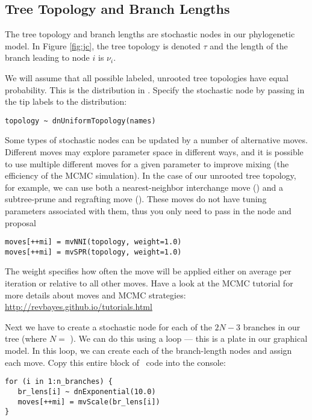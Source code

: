\subsection{Tree Topology and Branch Lengths}

The tree topology and branch lengths are stochastic nodes in our phylogenetic model. 
In Figure \ref{fig:jc}, the tree topology is denoted $\tau$ and the length of the branch leading to node $i$ is $\nu_i$.

We will assume that all possible labeled, unrooted tree topologies have equal probability. This is the  distribution in \RevBayes. Specify the  stochastic node by passing in the tip labels  to the  distribution:
{\tt \begin{snugshade*}
\begin{lstlisting}
topology ~ dnUniformTopology(names)
\end{lstlisting}
\end{snugshade*}}

Some types of stochastic nodes can be updated by a number of alternative moves. 
Different moves may explore parameter space in different ways, and it is possible to use multiple different moves for a given parameter to improve mixing (the efficiency of the MCMC simulation). 
In the case of our unrooted tree topology, for example, we can use both a nearest-neighbor interchange move () and a subtree-prune and regrafting move (). 
These moves do not have tuning parameters associated with them, thus you only need to pass in the  node and proposal  
{\tt \begin{snugshade*}
\begin{lstlisting}
moves[++mi] = mvNNI(topology, weight=1.0)
moves[++mi] = mvSPR(topology, weight=1.0)
\end{lstlisting}
\end{snugshade*}}
The weight specifies how often the move will be applied either on average per iteration or relative to all other moves.
Have a look at the MCMC tutorial for more details about moves and MCMC strategies: \href{http://revbayes.github.io/tutorials.html}{http://revbayes.github.io/tutorials.html}


Next we have to create a stochastic node for each of the $2N-3$ branches in our tree (where $N=$ ). 
We can do this using a  loop --- this is a plate in our graphical model. In this loop, we can create each of the branch-length nodes and assign each move. 
Copy this entire block of \Rev~code into the console:
{\tt \small \begin{snugshade*}
\begin{lstlisting}
for (i in 1:n_branches) {
   br_lens[i] ~ dnExponential(10.0)
   moves[++mi] = mvScale(br_lens[i]) 
}
\end{lstlisting}
\end{snugshade*}}

